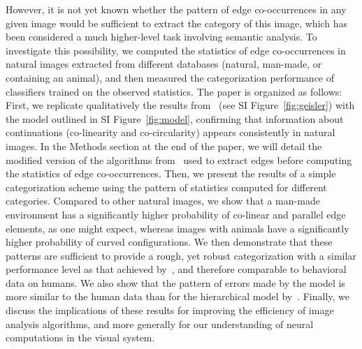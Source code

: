 \documentclass[a4paper]{article}
\begin{document}
However, it is not yet known whether the pattern of edge co-occurrences in any given image 
would be sufficient to extract the category of this image, 
which has been considered a much higher-level task involving semantic analysis. 
To investigate this possibility, we computed the statistics of edge co-occurrences in natural images 
extracted from different databases (natural, man-made, or containing an animal), 
and then measured the categorization performance of classifiers trained on the observed statistics. 
The paper is organized as follows: 
First, we replicate qualitatively the results from~\textcite{Geisler01} (see SI Figure~\ref{fig:geisler})
with the model outlined in SI Figure~\ref{fig:model}, 
confirming that information about continuations (co-linearity and co-circularity) 
appears consistently in natural images. 
In the Methods section at the end of the paper, 
we will detail the modified version of the algorithms from~\textcite{Geisler01} 
used to extract edges before computing the statistics of edge co-occurrences. 
Then, we present the results of a simple categorization scheme 
using the pattern of statistics computed for different categories. 
Compared to other natural images, we show that a man-made environment 
has a significantly higher probability of co-linear and parallel edge elements, as one might expect, 
whereas images with animals have a significantly higher probability of curved configurations. 
We then demonstrate that these patterns are sufficient to provide a 
rough, yet robust categorization with a similar performance level 
as that achieved by~\textcite{Serre07}, and therefore comparable to behavioral data on humans. 
We also show that the pattern of errors made by the model is more similar 
to the human data than for the hierarchical model by~\textcite{Serre07}. 
Finally, we discuss the implications of these results for improving the efficiency 
of image analysis algorithms, and more generally for our understanding of 
neural computations in the visual system. 
\end{document}
